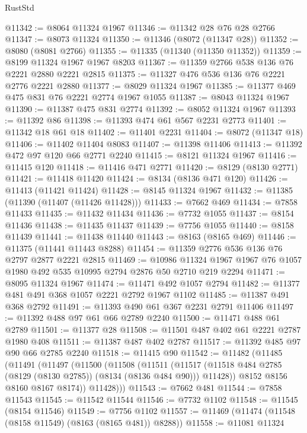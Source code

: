 \begin{lexlean}{RustStd}
\begin{coremodule}
@11342 := @8064 @11324 @1967
@11346 := @11342 @28 @76 @28 @2766
@11347 := @8073 @11324
@11350 := @11346 (@8072 (@11347 @28))
@11352 := @8080 (@8081 @2766)
@11355 := @11335 (@11340 (@11350 @11352))
@11359 := @8199 @11324 @1967 @1967 @8203
@11367 := @11359 @2766 @538 @136 @76 @2221 @2880 @2221 @2815
@11375 := @11327 @476 @536 @136 @76 @2221 @2776 @2221 @2880
@11377 := @8029 @11324 @1967
@11385 := @11377 @469 @475 @831 @76 @2221 @2774 @1967 @1055
@11387 := @8043 @11324 @1967
@11390 := @11387 @475 @831 @2774
@11392 := @8052 @11324 @1967
@11393 := @11392 @86
@11398 := @11393 @474 @61 @567 @2231 @2773
@11401 := @11342 @18 @61 @18
@11402 := @11401 @2231
@11404 := @8072 (@11347 @18)
@11406 := @11402 @11404 @8083
@11407 := @11398 @11406
@11413 := @11392 @472 @97 @120 @66 @2771 @2240
@11415 := @8121 @11324 @1967
@11416 := @11415 @120
@11418 := @11416 @471 @2771
@11420 := @8129 (@8130 @2771)
@11421 := @11418 @11420
@11424 := @8134 (@8136 @471 @120)
@11426 := @11413 (@11421 @11424)
@11428 := @8145 @11324 @1967
@11432 := @11385 (@11390 (@11407 (@11426 @11428)))
@11433 := @7662 @469
@11434 := @7858 @11433
@11435 := @11432 @11434
@11436 := @7732 @1055
@11437 := @8154 @11436
@11438 := @11435 @11437
@11439 := @7756 @1055
@11440 := @8158 @11439
@11441 := @11438 @11440
@11443 := @8163 (@8165 @469)
@11446 := @11375 (@11441 @11443 @8288)
@11454 := @11359 @2776 @536 @136 @76 @2797 @2877 @2221 @2815
@11469 := @10986
    @11324
    @1967
    @1967
    @76
    @1057
    @1980
    @492
    @535
    @10995
    @2794
    @2876
    @50
    @2710
    @219
    @2294
@11471 := @8095 @11324 @1967
@11474 := @11471 @492 @1057 @2794
@11482 := @11377 @481 @491 @368 @1057 @2221 @2792 @1967 @1102
@11485 := @11387 @491 @368 @2792
@11491 := @11393 @490 @61 @367 @2231 @2791 @11406
@11497 := @11392 @488 @97 @61 @66 @2789 @2240
@11500 := @11471 @488 @61 @2789
@11501 := @11377 @28
@11508 := @11501 @487 @402 @61 @2221 @2787 @1980 @408
@11511 := @11387 @487 @402 @2787
@11517 := @11392 @485 @97 @90 @66 @2785 @2240
@11518 := @11415 @90
@11542 := @11482
    (@11485
      (@11491
        (@11497
          (@11500
            (@11508
              (@11511
                (@11517 (@11518 @484 @2785 (@8129 (@8130 @2785)) (@8134 (@8136 @484 @90))) @11428))
              @8152
              @8156
              @8160
              @8167
              @8174))
          @11428)))
@11543 := @7662 @481
@11544 := @7858 @11543
@11545 := @11542 @11544
@11546 := @7732 @1102
@11548 := @11545 (@8154 @11546)
@11549 := @7756 @1102
@11557 := @11469 (@11474 (@11548 (@8158 @11549) (@8163 (@8165 @481)) @8288))
@11558 := @11081 @11324

\end{coremodule}
\end{lexlean}
